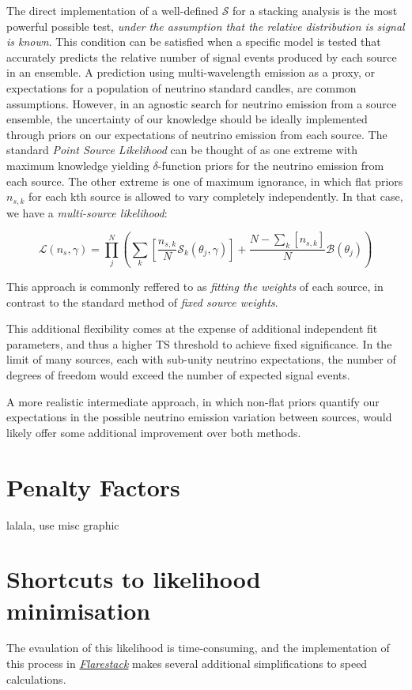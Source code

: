 The direct implementation of a well-defined $\mathcal{S}$ for a stacking analysis is the most powerful possible test, \emph{under the assumption that the relative distribution is signal is known}. This condition can be satisfied when a specific model is tested that accurately predicts the relative number of signal events produced by each source in an ensemble. A prediction using multi-wavelength emission as a proxy, or expectations for a population of neutrino standard candles, are common assumptions. However, in an agnostic search for neutrino emission from a source ensemble, the uncertainty of our knowledge should be ideally implemented through priors on our expectations of neutrino emission from each source. The standard \emph{Point Source Likelihood} can be thought of as one extreme with maximum knowledge yielding $\delta$-function priors for the neutrino emission from each source. The other extreme is one of maximum ignorance, in which flat priors $n_{s, k}$ for each kth source is allowed to vary completely independently. In that case, we have a \emph{multi-source likelihood}:

\[ \mathcal{L}(n_{s}, \gamma) = \prod_{j}^{N} \left(\sum_{k} \left[ \frac{n_{s, k}}{N} \mathcal{S}_{k}(\theta_{j}, \gamma) \right]+ \frac{N - \sum_{k} \left[ n_{s, k} \right] }{N} \mathcal{B}(\theta_{j})  \right)\]

This approach is commonly reffered to as \emph{fitting the weights} of each source, in contrast to the standard method of \emph{fixed source weights}. 

This additional flexibility comes at the expense of additional independent fit parameters, and thus a higher TS threshold to achieve fixed significance. In the limit of many sources, each with sub-unity neutrino expectations, the number of degrees of freedom would exceed the number of expected signal events.

A more realistic intermediate approach, in which non-flat priors quantify our expectations in the possible neutrino emission variation between sources, would likely offer some additional improvement over both methods. 

\section{Penalty Factors}
lalala, use misc graphic

\section{Shortcuts to likelihood minimisation}
The evaulation of this likelihood is time-consuming, and the implementation of this process in \emph{\href{https://github.com/IceCubeOpenSource/flarestack}{Flarestack}} makes several additional simplifications to speed calculations. 

